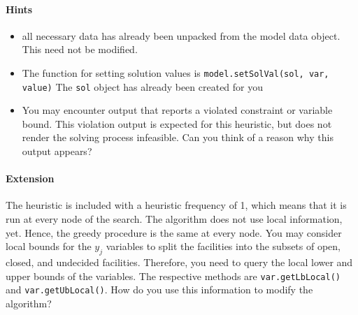 \documentclass[a4paper,10pt]{article}
\begin{document}
\paragraph{Hints}

\begin{itemize}
 \item all necessary data has already been unpacked from the 
 model data object. This need not be modified.
 \item The function for setting solution values 
 is \texttt{model.setSolVal(sol, var, value)}
 The \texttt{sol} object has already been created for you
 \item You may encounter output that 
 reports a violated constraint or variable bound. This
 violation output is expected for this heuristic, but
 does not render the solving process infeasible.
 Can you think of a reason why this output appears?
\end{itemize}
 
\paragraph{Extension}
 
 The heuristic is included with a heuristic frequency
 of 1, which means that it is run at every node of the search. The algorithm
 does not use local information, yet. Hence, the greedy procedure 
 is the same at every node.
 You may consider local bounds for the $y_{j}$
 variables to split the facilities into the subsets
 of open, closed, and undecided facilities. Therefore,
 you need to query the local lower and upper bounds of
 the variables. The respective methods are
 \texttt{var.getLbLocal()} and \texttt{var.getUbLocal()}.
 How do you use this information to modify the algorithm?
 
\end{document}
